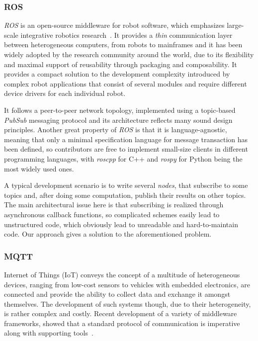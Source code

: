 \documentclass[sigplan,screen]{acmart}
\begin{document}
\subsubsection{ROS}
\textit{ROS} is an open-source middleware for robot software, which emphasizes
large-scale integrative robotics research~\cite{ROS}. It provides a \textit{thin}
communication layer between heterogeneous computers, from robots to mainframes
and it has been widely adopted by the research community around the world, due
to its flexibility and maximal support of reusability through packaging and
composability. It provides a compact solution to the development complexity
introduced by complex robot applications that consist of several modules and
require different device drivers for each individual robot.

It follows a peer-to-peer network topology, implemented using a topic-based
\textit{PubSub} messaging protocol and its architecture reflects many sound
design principles. Another great property of \textit{ROS} is that it is
language-agnostic, meaning that only a minimal specification language for
message transaction has been defined, so contributors are free to implement
small-size clients in different programming languages, with \textit{roscpp} for C++
and \textit{rospy} for Python being the most widely used ones.

A typical development scenario is to write several \textit{nodes}, that
subscribe to some topics and, after doing some computation, publish their
results on other topics. The main architectural issue here is that subscribing
is realized through asynchronous callback functions, so complicated schemes
easily lead to unstructured code, which obviously lead to unreadable and
hard-to-maintain code. Our approach gives a solution to the aforementioned
problem.

\subsubsection{MQTT}
Internet of Things (IoT) conveys the concept of a multitude of heterogeneous devices,
ranging from low-cost sensors to vehicles with embedded electronics, are connected and
provide the ability to collect data and exchange it amongst themselves.
The development of such systems though, due to their heterogeneity, is rather
complex and costly. Recent development of a variety of middleware frameworks,
showed that a standard protocol of communication is imperative along with supporting
tools~\cite{iot_middleware}.
\end{document}
